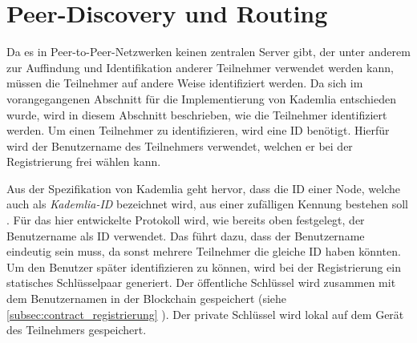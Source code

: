  \section{Peer-Discovery und Routing}
\label{subsec:identifikation_von_teilnehmern}

Da es in Peer-to-Peer-Netzwerken keinen zentralen Server gibt, der unter anderem zur Auffindung und Identifikation anderer Teilnehmer verwendet werden kann, müssen die Teilnehmer auf andere Weise identifiziert werden. Da sich im vorangegangenen Abschnitt für die Implementierung von Kademlia entschieden wurde, wird in diesem Abschnitt beschrieben, wie die Teilnehmer identifiziert werden. Um einen Teilnehmer zu identifizieren, wird eine ID benötigt. Hierfür wird der Benutzername des Teilnehmers verwendet, welchen er bei der Registrierung frei wählen kann. 


Aus der Spezifikation von Kademlia geht hervor, dass die ID einer Node, welche auch als \textit{Kademlia-ID} bezeichnet wird, aus einer zufälligen Kennung bestehen soll \parencite[S. 2]{Maymounkov_Kademlia}. Für das hier entwickelte Protokoll wird, wie bereits oben festgelegt, der Benutzername als ID verwendet. Das führt dazu, dass der Benutzername eindeutig sein muss, da sonst mehrere Teilnehmer die gleiche ID haben könnten. Um den Benutzer später identifizieren zu können, wird bei der Registrierung ein statisches Schlüsselpaar generiert. Der öffentliche Schlüssel wird zusammen mit dem Benutzernamen in der Blockchain gespeichert (siehe \ref{subsec:contract_registrierung} \textit{}). Der private Schlüssel wird lokal auf dem Gerät des Teilnehmers gespeichert. 

